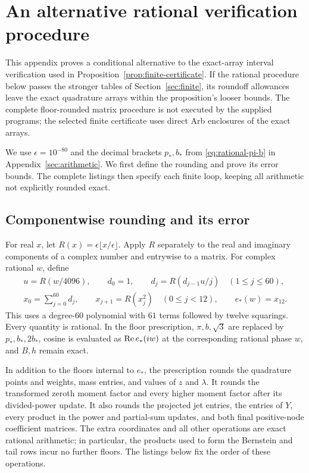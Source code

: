 \section{An alternative rational verification procedure}
\label{app:floor-certificate}

This appendix proves a conditional alternative to the exact-array interval
verification used in Proposition~\ref{prop:finite-certificate}.  If the
rational procedure below passes the stronger tables of
Section~\ref{sec:finite}, its roundoff allowances leave the exact quadrature
arrays within the proposition's looser bounds.  The complete floor-rounded
matrix procedure is not executed by the supplied programs; the selected
finite certificate uses direct Arb enclosures of the exact arrays.

We use $\epsilon=10^{-80}$ and the decimal brackets $p_*,b_*$ from
\eqref{eq:rational-pi-b} in Appendix~\ref{sec:arithmetic}.  We first define
the rounding and prove its error bounds.  The complete listings then specify
each finite loop, keeping all arithmetic not explicitly rounded exact.

\subsection{Componentwise rounding and its error}

For real $x$, let $R(x)=\epsilon\lfloor x/\epsilon\rfloor$.  Apply $R$
separately to the real and imaginary components of a complex number and
entrywise to a matrix.  For complex rational $w$, define
\begin{equation}\label{eq:rational-exponential}
\begin{gathered}
 u=R(w/4096),\qquad d_0=1,\qquad
 d_j=R(d_{j-1}u/j)\quad(1\le j\le60),\\
 x_0=\sum_{j=0}^{60}d_j,\qquad
 x_{j+1}=R(x_j^2)\quad(0\le j<12),\qquad e_*(w)=x_{12}.
\end{gathered}
\end{equation}
This uses a degree-$60$ polynomial with $61$ terms followed by twelve
squarings.  Every quantity is rational.  In the floor prescription,
$\pi,b,\sqrt3$ are replaced by $p_*,b_*,2b_*$, cosine is evaluated as
$\operatorname{Re} e_*(iw)$ at the corresponding rational phase $w$, and $B,h$ remain
exact.

In addition to the floors internal to $e_*$, the prescription rounds the
quadrature points and weights, mass entries, and values of $z$ and $\lambda$.
It rounds the transformed zeroth moment factor and every higher moment
factor after its divided-power update.  It also rounds the projected jet
entries, the entries of $Y$, every product in the power and partial-sum
updates, and both final positive-node coefficient matrices.  The extra
coordinates and all other operations are exact rational arithmetic; in
particular, the products used to form the Bernstein and tail rows incur no
further floors.  The listings below fix the order of these operations.

